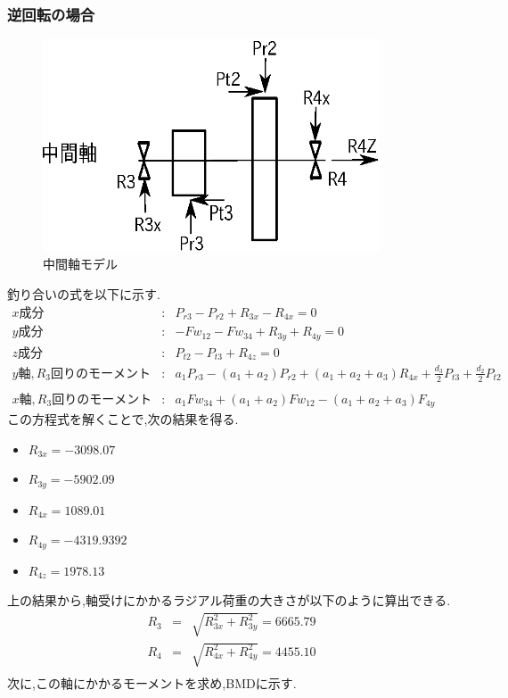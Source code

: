 \subsubsection{逆回転の場合}
\begin{figure}[htbp]
\begin{center}
\includegraphics[width=10cm]{../picture/jiku43.eps}
\end{center}
\caption{中間軸モデル}
\end{figure}
釣り合いの式を以下に示す.
\begin{eqnarray}
x成分&:&P_{r3}-P_{r2}+R_{3x}-R_{4x}=0\\
y成分&:&-Fw_{12}-Fw_{34}+R_{3y}+R_{4y}=0\\
z成分&:&P_{t2}-P_{t3}+R_{4z}=0\\
y軸,R_3回りのモーメント&:&a_1P_{r3}-(a_1+a_2)P_{r2}+(a_1+a_2+a_3)R_{4x}+\frac{d_3}{2}P_{t3}+\frac{d_2}{2}P_{t2}\nonumber\\
\\
x軸,R_3回りのモーメント&:&a_1Fw_{34}+(a_1+a_2)Fw_{12}-(a_1+a_2+a_3)F_{4y}
\end{eqnarray}
この方程式を解くことで,次の結果を得る.
\begin{itemize}
\item $R_{3x} = -3098.07$
\item $R_{3y} = -5902.09$
\item $R_{4x} = 1089.01$
\item $R_{4y} = -4319.9392$
\item $R_{4z} = 1978.13$
\end{itemize}
上の結果から,軸受けにかかるラジアル荷重の大きさが以下のように算出できる.
\begin{eqnarray}
R_3 &=& \sqrt {R_{3x}^2+R_{3y}^2} = 6665.79\\
R_4 &=& \sqrt {R_{4x}^2+R_{4y}^2} = 4455.10\\
\end{eqnarray}
次に,この軸にかかるモーメントを求め,BMDに示す.
